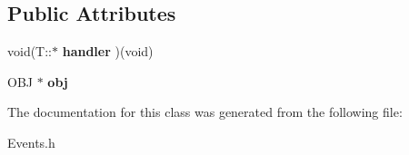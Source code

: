 \subsection*{Public Attributes}
\begin{DoxyCompactItemize}
\item 
\hypertarget{class_event0_a9f5c4b04f0f887ef7a2df146e10e9403}{void(T\-::$\ast$ {\bfseries handler} )(void)}\label{class_event0_a9f5c4b04f0f887ef7a2df146e10e9403}

\item 
\hypertarget{class_event0_ab37236e93d14993e36a8913ae2dbaf31}{O\-B\-J $\ast$ {\bfseries obj}}\label{class_event0_ab37236e93d14993e36a8913ae2dbaf31}

\end{DoxyCompactItemize}


The documentation for this class was generated from the following file\-:\begin{DoxyCompactItemize}
\item 
Events.\-h\end{DoxyCompactItemize}
